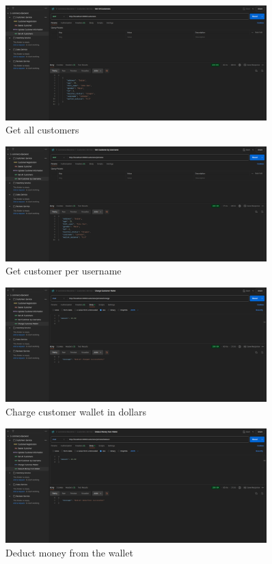 \documentclass{article}
\begin{document}
\begin{figure}[H]
\centering
\includegraphics[width=0.9\textwidth]{images/6.png}
\caption{Get all customers}
\end{figure}
\begin{figure}[H]
\centering
\includegraphics[width=0.9\textwidth]{images/7.png}
\caption{Get customer per username}
\end{figure}
\begin{figure}[H]
\centering
\includegraphics[width=0.9\textwidth]{images/8.png}
\caption{Charge customer wallet in dollars}
\end{figure}
\begin{figure}[H]
\centering
\includegraphics[width=0.9\textwidth]{images/9.png}
\caption{Deduct money from the wallet}
\end{figure}
\end{document}
